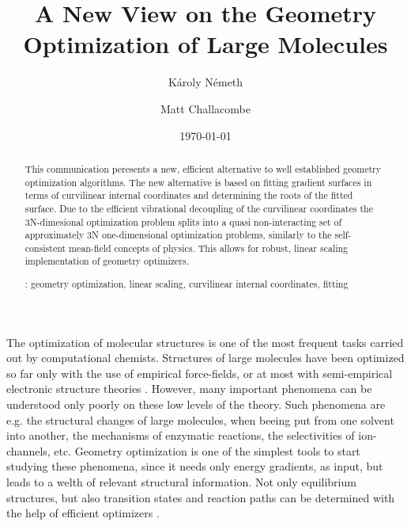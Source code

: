 \documentclass[prl,aps,twocolumn,showpacs,twocolumngrid,superbib]{revtex4}
\begin{document}
\title{
A New View on the Geometry Optimization of Large Molecules            
}

\author{K\'aroly N\'emeth}
\author{Matt Challacombe}


\date{\today}

\begin{abstract}
{
This communication peresents a new, efficient alternative to well established
geometry optimization algorithms. The new alternative is based on
fitting gradient surfaces in terms of curvilinear 
internal coordinates and 
determining the roots of the fitted surface. Due to the efficient 
vibrational decoupling of the curvilinear coordinates the 3N-dimesional
optimization problem splits into a quasi non-interacting
set of approximately 3N one-dimensional optimization problems, 
similarly to the self-consistent mean-field concepts of physics.
This allows for robust, linear scaling implementation of geometry optimizers.
}

\smallskip
{}: 
geometry optimization, linear scaling, 
curvilinear internal coordinates, fitting
\end{abstract}
 

\maketitle


The optimization of molecular structures is one of the most frequent
tasks carried out by computational chemists. 
Structures of large molecules have been optimized so far
only with the use of empirical force-fields, or at most with 
semi-empirical electronic structure theories 
\cite{Stewart_crambin_opt,Schlegel_plasminogen_opt}. However, many important phenomena
can be understood only poorly on these low levels of the theory. 
Such phenomena are e.g. the structural changes of large molecules, 
when beeing put from one solvent into another, the mechanisms of 
enzymatic reactions, the selectivities of ion-channels, etc. 
Geometry optimization is one of the simplest tools to start studying 
these phenomena, since it needs only energy gradients, as input, but 
leads to a welth of relevant structural information.
Not only equilibrium structures, but also transition states and reaction
paths can be determined with the help of efficient optimizers 
\cite{nudged_elastic_band}.
\end{document}
